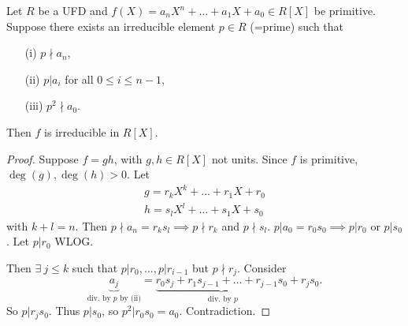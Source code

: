 \documentclass[egregdoesnotlikesansseriftitles,a4paper]{scrartcl}
\begin{document}
\begin{lemma}
       Let $R$ be a UFD and $f (X)=a_n X^{n}+\ldots+a_1 X+ a_0 \in R[X]$ be primitive. Suppose there exists an irreducible element $p \in R$ (=prime) such that 
       \begin{itemize}
             \item[(i)] $p \nmid a_n$,
             \item[(ii)] $p|a_i$ for all $0 \leq i \leq n-1$,
             \item[(iii)] $p^2 \nmid a_0 $.
       \end{itemize}
       Then $f$ is irreducible in $R[X]$.
       \begin{proof}
              Suppose $f=gh$, with $g,h \in R[X]$ not units. Since $f$ is primitive, $\operatorname{deg}(g), \operatorname{deg}(h)>0$. Let 
              \begin{align*}
                    g=r_k X^{k}+\ldots+r_1 X+r_0 \\
                    h=s_l X^{l}+\ldots+s_1 X+ s_0 
              \end{align*}
              with $k+l=n$. Then $p \nmid a_n=r_k s_l \implies p \nmid r_k$ and $p \nmid s_l$. $p| a_0 =r_0 s_0 \implies p| r_0 $ or $p|s_0 $. Let $p|r_0 $ WLOG. 
              
              Then $\exists \ j \leq k$ such that $p|r_0 , \ldots , p|r_{i-1}$ but $p \nmid r_j$. Consider \[
              \underbrace{a_j}_{\text{div. by } p \text{ by (ii)} }  = \underbrace{r_0 s_j +r_1 s_{j-1}+\ldots +r_{j-1}s_0}_{\text{ div. by } p}  +r_j s_0 
              .\] So $p|r_js_0 $. Thus $p|s_0 $, so $p^2 |r_0 s_0 =a_0 $. Contradiction.
       \end{proof}
\end{lemma}
\end{document}
